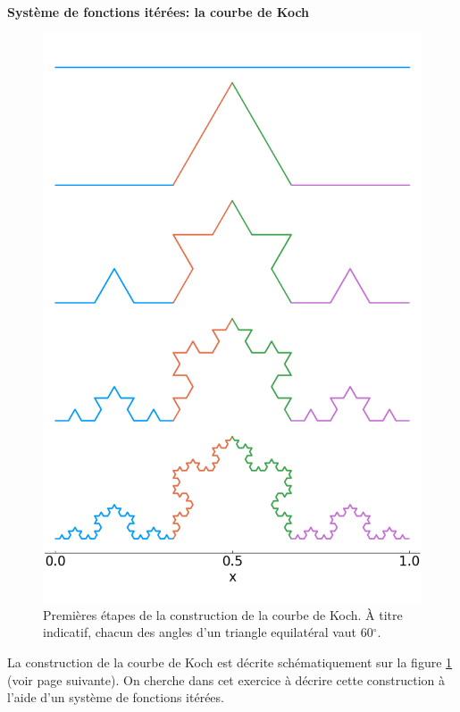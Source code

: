 \documentclass[12pt, answers]{exam}
\begin{document}
\begin{questions}

\question[10] \textbf{Système de fonctions itérées: la courbe de Koch}
  \noaddpoints

  \begin{figure}
    \centering
    \includegraphics[height=.6\textheight]{imgs/koch_curve.png}
    \caption{Premières étapes de la construction de la courbe de Koch. \`A titre indicatif, chacun des angles d'un triangle equilatéral vaut 60$^\circ$.}
    \label{fig: koch curve}
  \end{figure}

  La construction de la courbe de Koch est décrite schématiquement sur la figure \ref{fig: koch curve} (voir page suivante). On cherche dans cet exercice à décrire cette construction à l'aide d'un système de fonctions itérées.


\end{questions}
\end{document}
